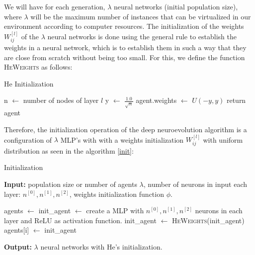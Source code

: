 \documentclass{iosart2c}
\begin{document}
We will have for each generation, $\lambda$ neural networks (initial population size), where $\lambda$ will be the maximum number of instances that can be virtualized in our environment according to computer resources. The initialization of the weights $W_{ij}^{[l]}$ of the $\lambda$ neural networks is done using the general rule to establish the weights in a neural network, which is to establish them in such a way that they are close from scratch without being too small. For this, we define the function \textsc{HeWeights} as follows: \\


\begin{algorithm}[h!]
\caption{He Initialization}\label{Hefunction}
\begin{algorithmic}[1]
\State n $\gets$ number of nodes of layer $l$  
\State y $\gets$ $\frac{1.0}{\sqrt{n}}$
\State agent.weights $\gets$ $U(-y,y)$ 
\State return agent 
\EndFunction
\end{algorithmic}
\end{algorithm}

Therefore, the initialization operation of the deep neuroevolution algorithm is a configuration of $\lambda$ MLP's with with a weights initialization $W_{ij}^{[l]}$ with uniform distribution as seen in the algorithm \ref{init}:


\begin{algorithm}[h!]
\caption{Initialization}\label{init}
\hspace*{\algorithmicindent} \textbf{Input:} population size or number of agents $\lambda$, number of neurons in input each layer: $n^{[0]}, n^{[1]}, n^{[2]}$, weights initialization function $\phi$.
\begin{algorithmic}[1]
\State agents $\gets$ 
\State init\_agent $\gets$ create a MLP with $n^{[0]}, n^{[1]}, n^{[2]}$ neurons in each layer and ReLU as activation function.
\State init\_agent $\gets$ \textsc{HeWeights}(init\_agent) 
\State agents[i] $\gets$ init\_agent 
\EndFor
\end{algorithmic}
\hspace*{\algorithmicindent} \textbf{Output:} $\lambda$ neural networks with He's initialization.
\end{algorithm}
\end{document}
